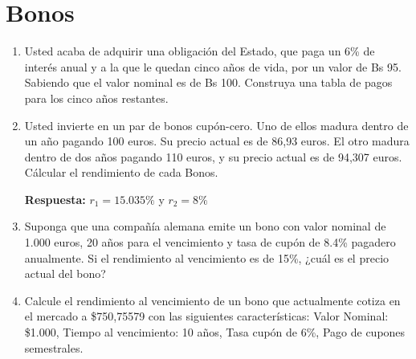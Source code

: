 \documentclass{article}
\begin{document}
\section{Bonos}
\begin{enumerate}
    \item Usted acaba de adquirir una obligación del Estado, que paga un 6\% de interés anual y a la que le quedan cinco años de vida, por un valor de Bs 95. Sabiendo que el valor nominal es de Bs 100. Construya una tabla de pagos para los cinco años restantes.
    \item Usted invierte en un par de bonos cupón-cero. Uno de ellos madura dentro de un año pagando 100 euros. Su precio actual es de 86,93 euros. El otro madura dentro de dos años pagando 110 euros, y su precio actual es de 94,307 euros. Cálcular el rendimiento de cada Bonos.
    
    \textbf{Respuesta:} $r_1=15.035\%$ y $r_2=8\%$
    \item Suponga que una compañía alemana emite un bono con valor nominal de 1.000 euros, 20 años para el vencimiento y tasa de cupón de 8.4\% pagadero anualmente. Si el rendimiento al vencimiento es de 15\%, ¿cuál es el precio actual del bono?
    \item Calcule el rendimiento al vencimiento de un bono que actualmente cotiza en el mercado a \$750,75579 con las siguientes características: Valor Nominal: \$1.000, Tiempo al vencimiento: 10 años, Tasa cupón de 6\%, Pago de cupones semestrales.    
\end{enumerate}
\end{document}
